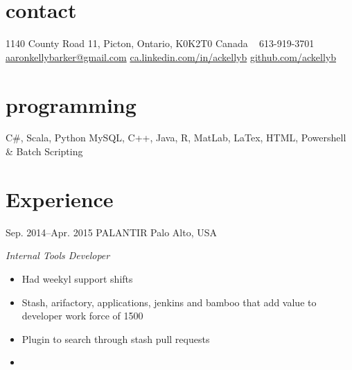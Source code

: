\documentclass[]{friggeri-cv} %
\begin{document}



\begin{aside} %
\section{contact}
1140 County Road 11, 
Picton, Ontario,
K0K2T0 Canada
~
613-919-3701
~
\href{mailto:aaron.kelly.barker@gmail.com}{aaronkellybarker@gmail.com}
\href{ca.linkedin.com/in/ackellyb/}{ca.linkedin.com/in/ackellyb}
\href{https://github.com/ackellyb}{github.com/ackellyb}
\section{programming}
C\#, Scala, Python
MySQL, C++, Java,
R, MatLab, LaTex, 
HTML, Powershell 
\& Batch Scripting
\end{aside}


\section{Experience}

\begin{entrylist}
\entry
{Sep. 2014--Apr. 2015}
{PALANTIR}
{Palo Alto, USA}
{\emph{Internal Tools Developer} \\
\begin{itemize}
	\item Had weekyl support shifts
	\item Stash, arifactory, applications, jenkins and bamboo that add value to developer work force of 1500
	\item Plugin to search through stash pull requests
	\item 
\end{itemize}
}
\end{entrylist}
\end{document}
